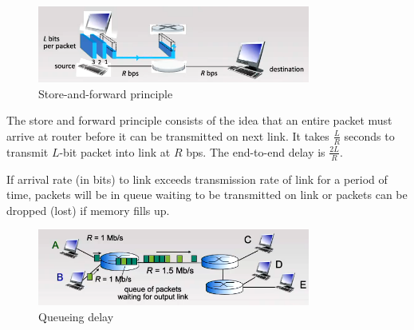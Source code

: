 \documentclass[a4paper]{article}
\theoremstyle{plain}
\theoremstyle{definition}
\newtheorem{defn}{Definition}[section]
\theoremstyle{remark}
\begin{document}
\begin{tcolorbox}[colback=black!3!white,colframe=black!60!white,title=\begin{defn}Store-and-forward principle \label{Store-and-forward principle}\end{defn}]
\begin{figure}[H]
	\centering
	\includegraphics[width=0.8\textwidth]{eighteen.png}
	\caption{Store-and-forward principle}
	\label{fig:eighteen-png}
\end{figure}
The store and forward principle consists of the idea that an entire packet must arrive at router before it can be transmitted on next link. It takes $\frac{L}{R}$ seconds to transmit $L $-bit packet into link at $R$ bps. The end-to-end delay is  $\frac{2L}{R}$.
\end{tcolorbox}
\begin{tcolorbox}[colback=black!3!white,colframe=black!60!white,title=\begin{defn}Queueing delay and loss \label{Queueing delay and loss}\end{defn}]
If arrival rate (in bits) to link exceeds transmission rate of link for a period of time, packets will be in queue waiting to be transmitted on link or packets can be dropped (lost) if memory fills up.
\begin{figure}[H]
	\centering
	\includegraphics[width=0.8\textwidth]{nineteen.png}
	\caption{Queueing delay}
	\label{fig:nineteen-png}
\end{figure}
\end{tcolorbox}
\end{document}
